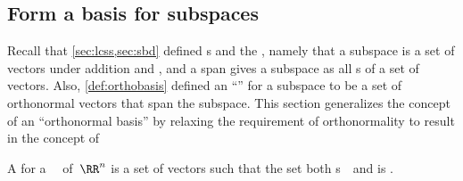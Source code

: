 \subsection{Form a basis for subspaces}


Recall that \cref{sec:lcss,sec:sbd} defined s and the , namely that a subspace is 
a set of vectors  under addition and , and a span gives a subspace as all s of a set of vectors.
Also, \cref{def:orthobasis} defined an ``'' for a subspace to be a set of orthonormal vectors that span the subspace.
This section generalizes the concept of an ``orthonormal basis'' by relaxing the requirement of orthonormality to result in the concept of 


\begin{definition} \label{def:basis} 
A  for a ~\WW\ of~\(\RR^n\) is a set of  vectors such that the set both s~\WW\ and is .
\end{definition}

